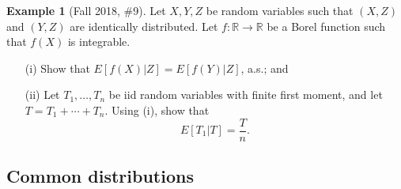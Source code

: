 \documentclass[12pt,reqno]{article}
\theoremstyle{plain}
\theoremstyle{definition}
\newtheorem{example}[theorem]{Example}
\begin{document}
\begin{example}[Fall 2018, \#9]
Let $X,Y,Z$ be random variables such that $(X,Z)$ and $(Y,Z)$ are 
identically distributed. Let $f: \mathbb{R} \rightarrow \mathbb{R}$ be 
a Borel function such that $f(X)$ is integrable. 
\begin{itemize} 

\item[(i)] Show that $E[f(X) | Z] = E[f(Y) | Z]$, a.s.; and 
\item[(ii)] Let $T_1,\ldots,T_n$ be iid random variables with finite 
     first moment, and let $T = T_1+\cdots+T_n$. Using (i), show that 
     \[
     E[T_1|T] = \frac{T}{n}. 
     \]
     
\end{itemize} 
\end{example} 

\subsection{Common distributions}
\end{document}

